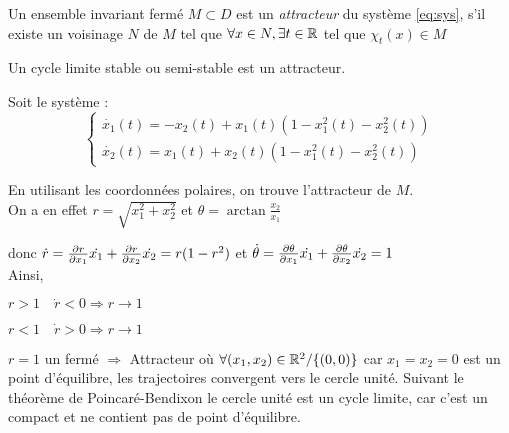 \documentclass[main.tex]{subfiles} \newcommand{\D}{\mathcal{D}}
\begin{document}
\begin{defin} Un ensemble invariant fermé $M \subset D$ est un
\emph{attracteur} du système \eqref{eq:sys}, s'il existe un voisinage $N$ de
$M$ tel que $\forall x \in N, \exists t \in \R$ tel que $\chi_t(x) \in M$
\end{defin}

\begin{rem} Un cycle limite stable ou semi-stable est un attracteur.  \end{rem}

\begin{exemple} Soit le système : \[ \begin{cases} \dot{x_1}(t) = -x_2(t) +
x_1(t)(1-x_1^2(t) - x_2^2(t)) \\ \dot{x_2}(t) = x_1(t) + x_2(t)(1-x_1^2(t) -
x_2^2(t)) \end{cases} \]

  En utilisant les coordonnées polaires, on trouve l'attracteur de $M$.\\

  On a en effet $r = \sqrt{x_1^2 + x_2^2}$ et $ \theta =
  \arctan\frac{x_2}{x_1}$

  donc $\dot{r} = \derivp[r]{x_1} \dot{x_1} + \derivp[r]{x_2}\dot{x_2} =
  r(1-r^2)$ et $\dot{\theta} = \derivp[\theta]{x_1}\dot{x_1} +
  \derivp[\theta]{x_2}\dot{x_2} = 1$\\

  Ainsi,

  $r>1 \quad \dot{r}<0 \Rightarrow r \rightarrow 1$

  $r<1 \quad \dot{r}>0 \Rightarrow r \rightarrow 1$

  $r=1$ un fermé $\Rightarrow$ Attracteur où $\forall (x_1,x_2) \in \R^2 /
  \{(0,0)\}$ car $x_1=x_2=0$ est un point d'équilibre, les trajectoires
  convergent vers le cercle unité. Suivant le théorème de Poincaré-Bendixon le
  cercle unité est un cycle limite, car c'est un compact et ne contient pas de
  point d'équilibre.  \end{exemple} 
\end{document}
